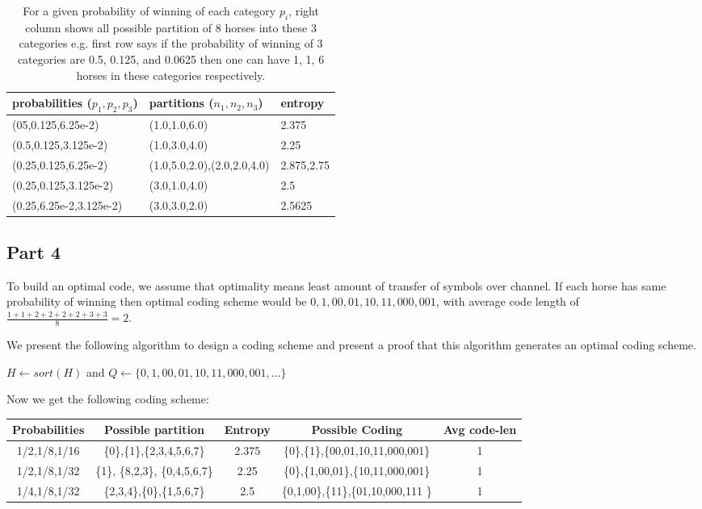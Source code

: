 \documentclass[a4paper,10pt]{article}
\begin{document}
\begin{table}[h]
    \centering
\begin{tabular}{l l l}
    \hline
    probabilities ($p_1,p_2,p_3$)& partitions ($n_1,n_2,n_3$) & entropy \\
    \hline 
    (05,0.125,6.25e-2) & (1.0,1.0,6.0) & 2.375 \\
    (0.5,0.125,3.125e-2) & (1.0,3.0,4.0) & 2.25 \\
    (0.25,0.125,6.25e-2) & (1.0,5.0,2.0),(2.0,2.0,4.0) & 2.875,2.75 \\
    (0.25,0.125,3.125e-2) & (3.0,1.0,4.0) & 2.5 \\
    (0.25,6.25e-2,3.125e-2) & (3.0,3.0,2.0) & 2.5625 \\
    \hline
\end{tabular}
\caption{For a given probability of winning of each category $p_i$, right column
    shows all possible partition of 8 horses into these 3 categories e.g. first
    row says if the probability of winning of 3 categories are 0.5, 0.125, and
0.0625 then one can have 1, 1, 6 horses in these categories respectively.}
\end{table}

\subsection{Part 4}

To build an optimal code, we assume that optimality means least amount of
transfer of symbols over channel. If each horse has same probability of winning
then optimal coding scheme would be ${0, 1, 00, 01, 10, 11, 000, 001}$, with
average code length of $\frac{1+1+2+2+2+2+3+3}{8} = 2$.

We present the following algorithm to design a coding scheme and present a proof
that this algorithm generates an optimal coding scheme.

\begin{algorithm}[H]
    $H \leftarrow sort(H)$ and $Q \leftarrow \{0,1,00,01,10,11,000,001,\ldots
    \}$\;

\end{algorithm}

Now we get the following coding scheme:

\begin{tabular}{c c c c c}
    \hline
    Probabilities & Possible partition & Entropy & Possible Coding & Avg
    code-len \\
    \hline
    1/2,1/8,1/16 & \{0\},\{1\},\{2,3,4,5,6,7\} & 2.375 &
    \{0\},\{1\},\{00,01,10,11,000,001\} & 1 \\
    1/2,1/8,1/32 & \{1\}, \{8,2,3\}, \{0,4,5,6,7\} & 2.25 &
    \{0\},\{1,00,01\},\{10,11,000,001\} & 1 \\
    1/4,1/8,1/32 & \{2,3,4\},\{0\},\{1,5,6,7\} & 2.5 & 
    \{0,1,00\},\{11\},\{01,10,000,111 \} & 1\\
    \hline
\end{tabular}
\end{document}
